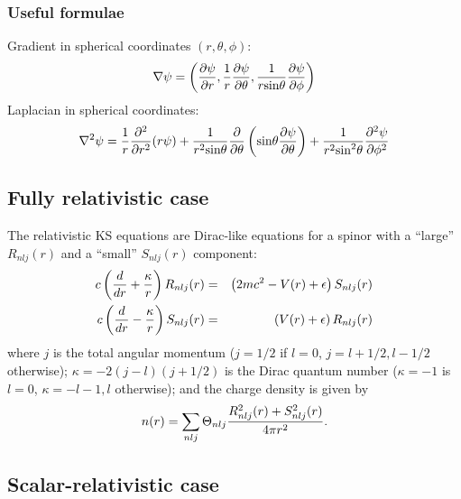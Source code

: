 \subsubsection{Useful formulae} 

Gradient in spherical coordinates $(r,\theta,\phi)$:
\begin{equation}
\nabla\psi = \left({\partial\psi\over\partial r},
                   {1\over r}{\partial\psi\over\partial\theta},
                   {1\over r \mbox{sin}\theta}
                              {\partial\psi\over\partial\phi}
             \right)
\end{equation}
Laplacian in spherical coordinates:
\begin{equation}
\nabla^2\psi = {1\over r} {\partial^2\over\partial r^2}(r\psi)
             + {1\over r^2\mbox{sin}\theta} {\partial\over\partial\theta}
               \left(\mbox{sin}\theta{\partial\psi\over\partial\theta}\right)
             + {1\over r^2\mbox{sin}^2\theta}
                {\partial^2\psi\over\partial\phi^2}
\end{equation}

\subsection{Fully relativistic case} 

The relativistic KS equations are
Dirac-like equations for a spinor with a ``large'' $R_{nlj}(r)$ and
a ``small'' $S_{nlj}(r)$ component:
\begin{eqnarray}
c\left({d \over dr} + {\kappa\over r}\right)R_{nlj}(r) & = & 
       \left(2mc^2 - V(r) + \epsilon \right)S_{nlj}(r)\\
c\left({d \over dr} - {\kappa\over r}\right)S_{nlj}(r) & = & 
       \left( V(r) + \epsilon \right)       R_{nlj}(r)
\end{eqnarray}
where $j$ is the total angular momentum ($j=1/2$ if $l=0$, 
$j=l+1/2,l-1/2$ otherwise); $\kappa=-2(j-l)(j+1/2)$ is the Dirac 
quantum number ($\kappa=-1$ is $l=0$, $\kappa=-l-1,l$ otherwise);
and the charge density is given by
\begin{equation}
  n(r) = \sum_{nlj} \Theta_{nlj}{R^2_{nlj}(r)+S^2_{nlj}(r)\over 4\pi r^2}.
\end{equation}


\subsection{Scalar-relativistic case} 

